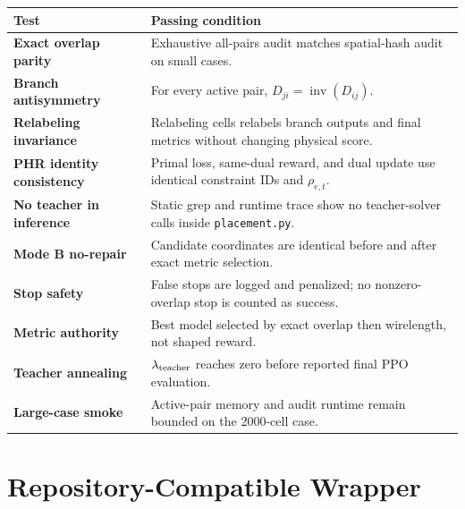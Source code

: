 \documentclass[11pt]{article}
\begin{document}
\begin{center}
\small
\begin{tabularx}{\textwidth}{>{\bfseries\color{navy}}p{}Y}
\toprule
Test & Passing condition \\
\midrule
Exact overlap parity & Exhaustive all-pairs audit matches spatial-hash audit on small cases. \\
Branch antisymmetry & For every active pair, $D_{ji}=\operatorname{inv}(D_{ij})$. \\
Relabeling invariance & Relabeling cells relabels branch outputs and final metrics without changing physical score. \\
PHR identity consistency & Primal loss, same-dual reward, and dual update use identical constraint IDs and $\rho_{e,t}$. \\
No teacher in inference & Static grep and runtime trace show no teacher-solver calls inside \texttt{placement.py}. \\
Mode B no-repair & Candidate coordinates are identical before and after exact metric selection. \\
Stop safety & False stops are logged and penalized; no nonzero-overlap stop is counted as success. \\
Metric authority & Best model selected by exact overlap then wirelength, not shaped reward. \\
Teacher annealing & $\lambda_{\rm teacher}$ reaches zero before reported final PPO evaluation. \\
Large-case smoke & Active-pair memory and audit runtime remain bounded on the 2000-cell case. \\
\bottomrule
\end{tabularx}
\end{center}

\section{Repository-Compatible Wrapper}
\end{document}

